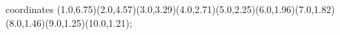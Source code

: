 					coordinates { (1.0,6.75)(2.0,4.57)(3.0,3.29)(4.0,2.71)(5.0,2.25)(6.0,1.96)(7.0,1.82)(8.0,1.46)(9.0,1.25)(10.0,1.21)};